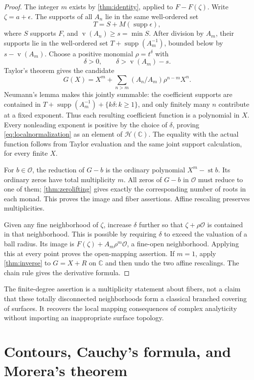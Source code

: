 \documentclass[11pt,letterpaper]{article}
\numberwithin{equation}{section}
\theoremstyle{definition}
\theoremstyle{remark}
\newcommand{\C}{\mathbb{C}}
\newcommand{\OO}{\mathcal{O}}
\newcommand{\HH}{\mathcal{H}}
\newcommand{\st}{\operatorname{st}}
\newcommand{\supp}{\operatorname{supp}}
\newcommand{\val}{\operatorname{v}}
\begin{document}
\begin{proof}
The integer $m$ exists by \cref{thm:identity}, applied to $F-F(\zeta)$.
Write $\zeta=a+\epsilon$. The supports of all $A_n$ lie in the same
well-ordered set
\[
 T=S+M(\supp\epsilon),
\]
where $S$ supports $F$, and $\val(A_n)\ge s=\min S$.
After division by $A_m$, their supports lie in the well-ordered set
$T+\supp(A_m^{-1})$, bounded below by $s-\val(A_m)$.
Choose a positive monomial $\rho=t^\delta$ with
\[
 \delta>0,\qquad \delta>\val(A_m)-s.
\]
Taylor's theorem gives the candidate
\[
 G(X)=X^m+\sum_{n>m}(A_n/A_m)\rho^{n-m}X^n.
\]
Neumann's lemma makes this jointly summable: the coefficient supports are
contained in $T+\supp(A_m^{-1})+\{k\delta:k\ge1\}$, and only finitely
many $n$ contribute at a fixed exponent. Thus each resulting coefficient
function is a polynomial in $X$. Every nonleading exponent is positive by
the choice of $\delta$, proving \eqref{eq:localnormalization} as an element
of $\HH(\C)$. The equality with the actual function follows from Taylor
evaluation and the same joint support calculation, for every finite $X$.

For $b\in\OO$, the reduction of $G-b$ is the ordinary polynomial
$X^m-\st b$. Its ordinary zeros have total multiplicity $m$. All zeros of
$G-b$ in $\OO$ must reduce to one of them; \cref{thm:zerolifting} gives
exactly the corresponding number of roots in each monad. This proves the
image and fiber assertions. Affine rescaling preserves multiplicities.

Given any fine neighborhood of $\zeta$, increase $\delta$ further so that
$\zeta+\rho\OO$ is contained in that neighborhood. This is possible by
requiring $\delta$ to exceed the valuation of a ball radius. Its image is
$F(\zeta)+A_m\rho^m\OO$, a fine-open neighborhood. Applying this at
every point proves the open-mapping assertion. If $m=1$, apply
\cref{thm:inverse} to $G=X+R$ on $\C$ and then undo the two affine
rescalings. The chain rule gives the derivative formula.
\end{proof}

The finite-degree assertion is a multiplicity statement about fibers, not a
claim that these totally disconnected neighborhoods form a classical
branched covering of surfaces. It recovers the local mapping consequences
of complex analyticity without importing an inappropriate surface topology.

\section{Contours, Cauchy's formula, and Morera's theorem}\label{sec:contours}
\end{document}
